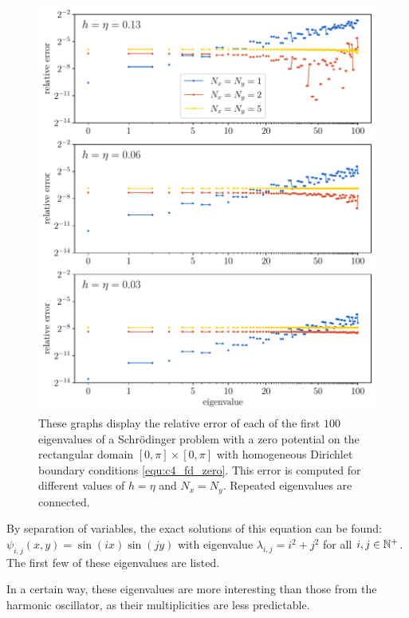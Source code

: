 \begin{figure}
    \begin{center}
        \includegraphics[width=\textwidth]{img/chapter4/fd_zero.pdf}
    \end{center}
    \caption{These graphs display the relative error of each of the first $100$ eigenvalues of a Schrödinger problem with a zero potential on the rectangular domain $[0, \pi] \times [0, \pi]$ with homogeneous Dirichlet boundary conditions \eqref{equ:c4_fd_zero}. This error is computed for different values of $h = \eta$ and $N_x = N_y$. Repeated eigenvalues are connected.}
    \label{fig:c4_fd_zero}
\end{figure}

By separation of variables, the exact solutions of this equation can be found: $\psi_{i, j}(x, y) = \sin(i x)\sin(j y)$ with eigenvalue $\lambda_{i,j} = i^2 + j^2$ for all $i, j \in \mathbb{N}^{+}$. The first few of these eigenvalues are listed.


In a certain way, these eigenvalues are more interesting than those from the harmonic oscillator, as their multiplicities are less predictable.

